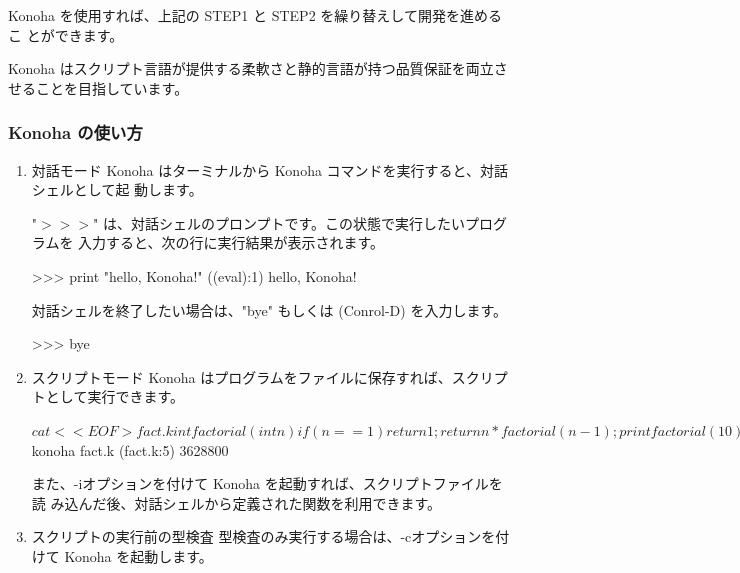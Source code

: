 \documentclass[mingoth,a4paper]{jsarticle}
\begin{document}
Konoha を使用すれば、上記の STEP1 と STEP2 を繰り替えして開発を進めるこ
とができます。

Konoha はスクリプト言語が提供する柔軟さと静的言語が持つ品質保証を両立さ
せることを目指しています。

\subsubsection{Konoha の使い方}
\begin{enumerate}
\item 対話モード
Konoha はターミナルから Konoha コマンドを実行すると、対話シェルとして起
動します。


"$>>>$" は、対話シェルのプロンプトです。この状態で実行したいプログラムを
入力すると、次の行に実行結果が表示されます。

\begin{commandline}
>>> print "hello, Konoha!"
((eval):1) hello, Konoha!
\end{commandline}

対話シェルを終了したい場合は、"bye" もしくは (Conrol-D) を入力します。

\begin{commandline}
>>> bye
\end{commandline}

\item スクリプトモード
Konoha はプログラムをファイルに保存すれば、スクリプトとして実行できます。

\begin{commandline}
$ cat <<EOF > fact.k
int factorial(int n) {
  if(n == 1) return 1;
  return n * factorial(n - 1);
}
print factorial(10);
EOF

$ konoha fact.k
(fact.k:5) 3628800
\end{commandline}

また、-iオプションを付けて Konoha を起動すれば、スクリプトファイルを読
み込んだ後、対話シェルから定義された関数を利用できます。

\clearpage

\item スクリプトの実行前の型検査
型検査のみ実行する場合は、-cオプションを付けて Konoha を起動します。


\end{enumerate}
\end{document}
